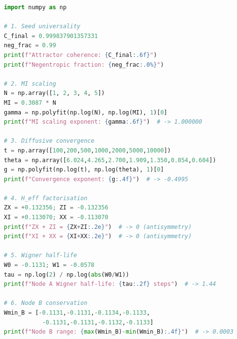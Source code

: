 \documentclass[12pt]{article}
\begin{document}
\begin{lstlisting}[language=Python,
  caption={Standalone validation of key numerical claims.}]
import numpy as np

# 1. Seed universality
C_final = 0.999837901357331
neg_frac = 0.99
print(f"Attractor coherence: {C_final:.6f}")
print(f"Negentropic fraction: {neg_frac:.0%}")

# 2. MI scaling
N = np.array([1, 2, 3, 4, 5])
MI = 0.3087 * N
gamma = np.polyfit(np.log(N), np.log(MI), 1)[0]
print(f"MI scaling exponent: {gamma:.6f}")  # -> 1.000000

# 3. Diffusive convergence
t = np.array([100,200,500,1000,2000,5000,10000])
theta = np.array([6.024,4.265,2.700,1.909,1.350,0.854,0.604])
g = np.polyfit(np.log(t), np.log(theta), 1)[0]
print(f"Convergence exponent: {g:.4f}")  # -> -0.4995

# 4. H_eff factorisation
ZX = +0.132356; ZI = -0.132356
XI = +0.113070; XX = -0.113070
print(f"ZX + ZI = {ZX+ZI:.2e}")  # -> 0 (antisymmetry)
print(f"XI + XX = {XI+XX:.2e}")  # -> 0 (antisymmetry)

# 5. Wigner half-life
W0 = -0.1131; W1 = -0.0578
tau = np.log(2) / np.log(abs(W0/W1))
print(f"Node A Wigner half-life: {tau:.2f} steps")  # -> 1.44

# 6. Node B conservation
Wmin_B = [-0.1131,-0.1131,-0.1134,-0.1133,
           -0.1131,-0.1131,-0.1132,-0.1133]
print(f"Node B range: {max(Wmin_B)-min(Wmin_B):.4f}")  # -> 0.0003
\end{lstlisting}
\end{document}
